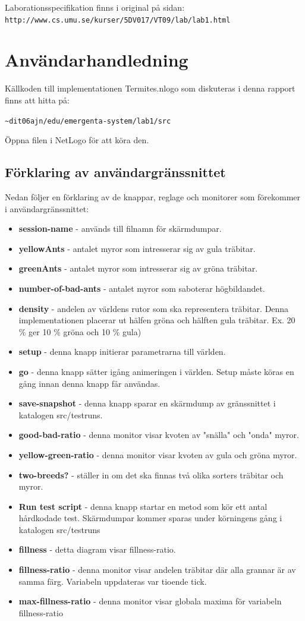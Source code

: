 \documentclass[titlepage, a4paper, 12pt]{article}
\begin{document}
Laborationsspecifikation finns i original på sidan:\\
\verb!http://www.cs.umu.se/kurser/5DV017/VT09/lab/lab1.html!

\section{Användarhandledning}
Källkoden till implementationen Termites.nlogo som diskuteras i denna
rapport finns att hitta på:

\verb!~dit06ajn/edu/emergenta-system/lab1/src!

Öppna filen i NetLogo för att köra den.

\subsection{Förklaring av användargränssnittet}
Nedan följer en förklaring av de knappar, reglage och monitorer som
förekommer i användargränssnittet:

\begin{itemize}
\item \textbf{session-name} - används till filnamn för skärmdumpar.
\item \textbf{yellowAnts} - antalet myror som intresserar sig av gula träbitar.
\item \textbf{greenAnts} - antalet myror som intresserar sig av gröna träbitar.
\item \textbf{number-of-bad-ants} - antalet myror som saboterar högbildandet.
\item \textbf{density} - andelen av världens rutor som ska
  representera träbitar. Denna implementationen placerar ut hälfen gröna
  och hälften gula träbitar. Ex. 20 \% ger 10 \% gröna och 10 \% gula)
\item \textbf{setup} - denna knapp initierar parametrarna till världen.
\item \textbf{go} - denna knapp sätter igång animeringen i
  världen. Setup måste köras en gång innan denna knapp får användas.
\item \textbf{save-snapshot} - denna knapp sparar en skärmdump av
  gränssnittet i katalogen src/testruns.
\item \textbf{good-bad-ratio} - denna monitor visar kvoten av "snälla"
  och "onda" myror.
\item \textbf{yellow-green-ratio} - denna monitor visar kvoten av gula
  och gröna myror.
\item \textbf{two-breeds?} - ställer in om det ska finnas två olika
  sorters träbitar och myror.
\item \textbf{Run test script} - denna knapp startar en metod som kör
  ett antal hårdkodade test. Skärmdumpar kommer sparas under
  körningens gång i katalogen src/testruns
\item \textbf{fillness} - detta diagram visar fillness-ratio.
\item \textbf{fillness-ratio} - denna monitor visar andelen träbitar där
  alla grannar är av samma färg. Variabeln uppdateras var tioende
  tick.
\item \textbf{max-fillness-ratio} - denna monitor visar globala maxima
  för variabeln fillness-ratio
\end{itemize}
\end{document}
